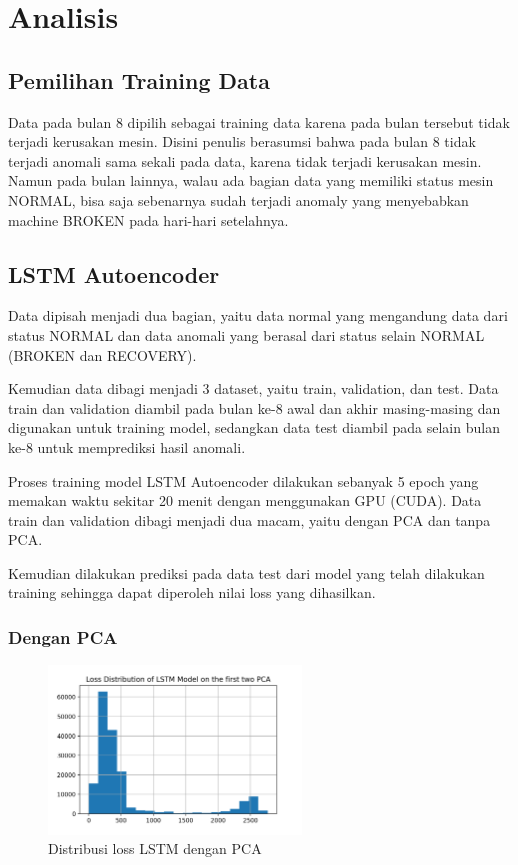 \chapter{Analisis}

\section{Pemilihan Training Data}
Data pada bulan 8 dipilih sebagai training data karena pada bulan tersebut tidak terjadi kerusakan mesin. Disini penulis berasumsi bahwa pada bulan 8 tidak terjadi anomali sama sekali pada data, karena tidak terjadi kerusakan mesin. Namun pada bulan lainnya, walau ada bagian data yang memiliki status mesin NORMAL, bisa saja sebenarnya sudah terjadi anomaly yang menyebabkan machine BROKEN pada hari-hari setelahnya.

\section{LSTM Autoencoder}

Data dipisah menjadi dua bagian, yaitu data normal yang mengandung data dari status NORMAL dan data anomali yang berasal dari status selain NORMAL (BROKEN dan RECOVERY).

Kemudian data dibagi menjadi 3 dataset, yaitu train, validation, dan test. Data train dan validation diambil pada bulan ke-8 awal dan akhir masing-masing dan digunakan untuk training model, sedangkan data test diambil pada selain bulan ke-8 untuk memprediksi hasil anomali.

Proses training model LSTM Autoencoder dilakukan sebanyak 5 epoch yang memakan waktu sekitar 20 menit dengan menggunakan GPU (CUDA). Data train dan validation dibagi menjadi dua macam, yaitu dengan PCA dan tanpa PCA.

Kemudian dilakukan prediksi pada data test dari model yang telah dilakukan training sehingga dapat diperoleh nilai loss yang dihasilkan.

    \subsection{Dengan PCA}

    \begin{figure}[h]
        \centering
        \includegraphics[width=0.6\textwidth]{resources/LSTM/LSTM_PCA_LossDist.png}
        \caption{Distribusi loss LSTM dengan PCA}
    \end{figure}

